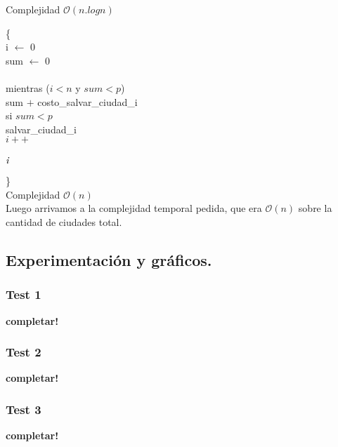Complejidad $\mathcal{O}(n.log n)$
\\
\begin{codebox}
\{\\
i $\longleftarrow$ 0\\
sum $\longleftarrow$ 0\\
\\
mientras ($i<n$ y $sum<p$) \\
   
   \quad sum $+$ costo_salvar_ciudad_i\\
   
   \quad si $sum<p$\\
      \quad  \qquad salvar_ciudad_i\\
  \quad $i++$\\
   \\
\Return $\id{i}$       
\end{codebox} 
\}
\\Complejidad $\mathcal{O}(n)$
\\
Luego arrivamos a la complejidad temporal pedida, que era $\mathcal{O}(n)$ sobre la cantidad de ciudades total.


\newpage
\subsection{Experimentación y gráficos.}

\vspace*{0.3cm}

\subsubsection{Test 1}

\vspace*{0.3cm}

\textbf{completar!}


\newpage
\subsubsection{Test 2}

\vspace*{0.3cm}

\textbf{completar!}


\newpage
\subsubsection{Test 3}

\vspace*{0.3cm}

\textbf{completar!}
